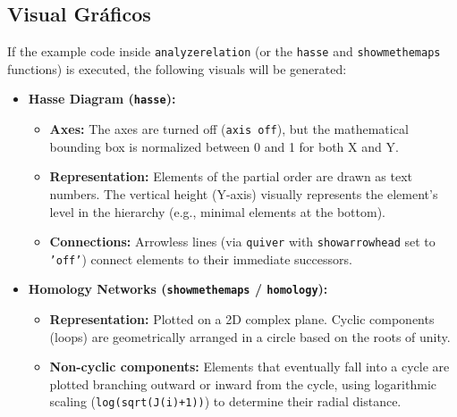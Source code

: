 \subsection*{Visual Gráficos}


If the example code inside \texttt{analyzerelation} (or the \texttt{hasse} and \texttt{showmethemaps} functions) is executed, the following visuals will be generated:

\begin{itemize}
    \item \textbf{Hasse Diagram (\texttt{hasse}):}
    \begin{itemize}
        \item \textbf{Axes:} The axes are turned off (\texttt{axis off}), but the mathematical bounding box is normalized between 0 and 1 for both X and Y.
        \item \textbf{Representation:} Elements of the partial order are drawn as text numbers. The vertical height (Y-axis) visually represents the element's level in the hierarchy (e.g., minimal elements at the bottom).
        \item \textbf{Connections:} Arrowless lines (via \texttt{quiver} with \texttt{showarrowhead} set to \texttt{'off'}) connect elements to their immediate successors.
    \end{itemize}
    \item \textbf{Homology Networks (\texttt{showmethemaps} / \texttt{homology}):}
    \begin{itemize}
        \item \textbf{Representation:} Plotted on a 2D complex plane. Cyclic components (loops) are geometrically arranged in a circle based on the roots of unity.
        \item \textbf{Non-cyclic components:} Elements that eventually fall into a cycle are plotted branching outward or inward from the cycle, using logarithmic scaling (\texttt{log(sqrt(J(i)+1))}) to determine their radial distance.
    \end{itemize}
\end{itemize}
